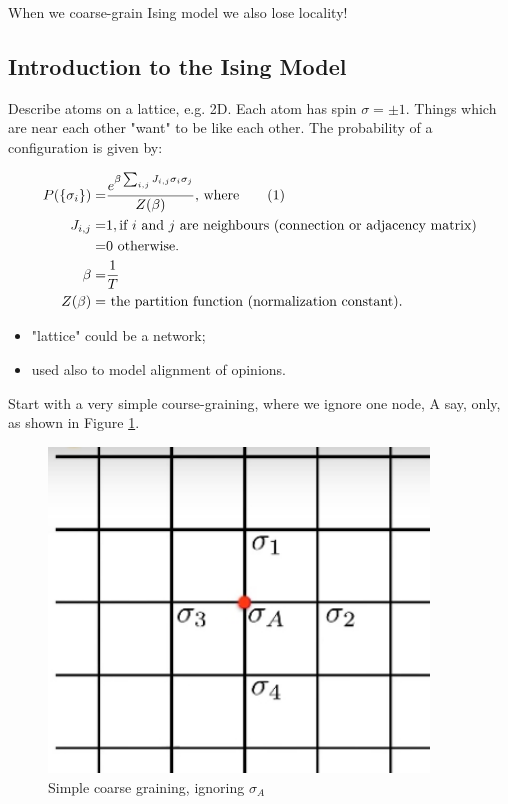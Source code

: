 \documentclass[]{article}
\newcommand\numberthis{\addtocounter{equation}{1}\tag{\theequation}}
\begin{document}
When we coarse-grain Ising model we also lose locality!
\subsection{Introduction to the Ising Model}

Describe atoms on a lattice, e.g. 2D. Each atom has spin $\sigma=\pm 1$. Things which are near each other "want" to be like each other. The probability of a configuration is given by:

\begin{align*}
P(\{\sigma_i\}) =& \frac{e^{\beta \sum_{i,j} J_{i,j} \sigma_i \sigma_j}}{Z(\beta)}\text{, where} \numberthis \label{eq:coarse_ising:P} \\
J_{i,j} =& 1,\text{if $i$ and $j$ are neighbours (connection or adjacency matrix)}\\
=& 0 \text{ otherwise.}\\
\beta =& \frac{1}{T}\\
Z(\beta) =& \text{ the partition function (normalization constant).}
\end{align*}

\begin{itemize}
	\item "lattice" could be a network;
	\item used also to model alignment of opinions.
\end{itemize}

Start with a very simple course-graining, where we ignore one node, A say, only, as shown in Figure \ref{fig:ising-coarse1}.

\begin{figure}[H]
	\caption{Simple coarse graining, ignoring $\sigma_A$}\label{fig:ising-coarse1}
	\includegraphics[width=0.9\textwidth]{ising-coarse1}
\end{figure}
\end{document}
